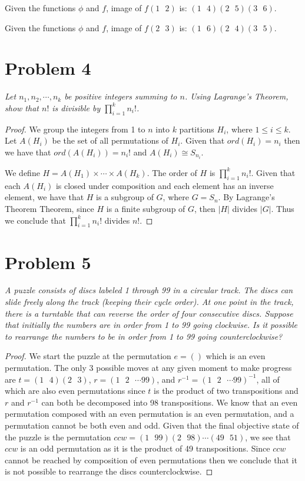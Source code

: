 \documentclass{article}
\theoremstyle{plain} %
\theoremstyle{definition} %
\begin{document}
Given the functions $\phi$ and $f$, image of $f(1\text{ }2)$ is: $(1\text{ }4)(2\text{ }5)(3\text{ }6)$. 

Given the functions $\phi$ and $f$, image of $f(2\text{ }3)$ is: $(1\text{ }6)(2\text{ }4)(3\text{ }5)$.

\section*{Problem 4}
\noindent\textit{Let $n_1,n_2,\cdots,n_k$ be positive integers
summing to $n$. Using Lagrange's Theorem, show that $n!$ is divisible
by $\prod_{i=1}^{k}n_i!$.}

\begin{proof}
    We group the integers from 1 to $n$ into $k$ partitions $H_i$, where
    $1 \leq i \leq k$. Let $A(H_i)$ be the set of all permutations
    of $H_i$. Given that $ord(H_i) = n_i$ then we have that
    $ord(A(H_i))= n_i!$ and $A(H_i) \cong S_{n_i}$.
    
    We define $H=A(H_1)\times \cdots \times A(H_k)$. The order of $H$
    is $\prod_{i=1}^{k}n_i!$. Given that each $A(H_i)$ is 
    closed under composition and each element has an inverse element, we have that
    $H$ is a subgroup of $G$, where $G=S_n$. By Lagrange's Theorem
    Theorem, since $H$ is a finite subgroup of $G$, then $|H|$ divides $|G|$. 
    Thus we conclude that $\prod_{i=1}^{k}n_i!$ divides $n!$.

\end{proof}

\section*{Problem 5}
\noindent\textit{A puzzle consists of discs labeled 1 through 99 in a circular track.
The discs can slide freely along the track (keeping their cycle order). At one point in the track, there is 
a turntable that can reverse the order of four consecutive discs. Suppose 
that initially the numbers are in order from 1 to 99 going clockwise. Is it
possible to rearrange the numbers to be in order from 1 to 99 going
counterclockwise?}

\begin{proof}
We start the puzzle at the permutation $e=()$ which is an even permutation.
The only 3 possible moves at any given moment to make progress are $t = (1\text{ }4)(2\text{ }3)$,
$r = (1\text{ }2\text{ }\cdots 99)$, and $r^{-1} = (1\text{ }2\text{ }\cdots 99)^{-1}$, all of
which are also even permutations since $t$ is the product of two transpositions and $r$ and $r^{-1}$ can both be decomposed
into 98 transpositions. We know that an even permutation composed with an even permutation
is an even permutation, and a permutation cannot be both even and odd. Given that the final
objective state of the puzzle is the permutation $ccw=(1\text{ }99)(2\text{ }98)\cdots(49\text{ }51)$, we see
that $ccw$ is an odd permutation as it is the product of 49 transpositions. Since $ccw$ cannot be reached by composition of
even permutations then we conclude that it is not possible to rearrange the discs
counterclockwise.
\end{proof}
\end{document}
